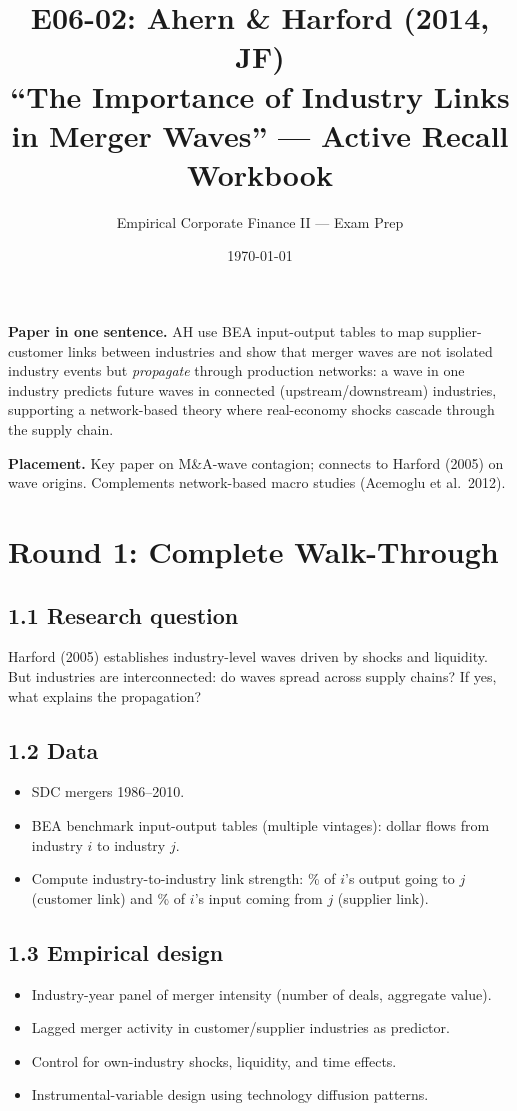 \documentclass[11pt]{article}
\title{E06-02: Ahern \& Harford (2014, JF) \\
\large ``The Importance of Industry Links in Merger Waves'' --- Active Recall Workbook}
\author{Empirical Corporate Finance II --- Exam Prep}
\date{\today}
\begin{document}
\maketitle

\begin{keybox}
\textbf{Paper in one sentence.} AH use BEA input-output tables to map supplier-customer links between industries and show that merger waves are not isolated industry events but \emph{propagate} through production networks: a wave in one industry predicts future waves in connected (upstream/downstream) industries, supporting a network-based theory where real-economy shocks cascade through the supply chain.

\textbf{Placement.} Key paper on M\&A-wave contagion; connects to Harford (2005) on wave origins. Complements network-based macro studies (Acemoglu et al.\ 2012).
\end{keybox}

\section*{Round 1: Complete Walk-Through}

\subsection*{1.1 Research question}
Harford (2005) establishes industry-level waves driven by shocks and liquidity. But industries are interconnected: do waves spread across supply chains? If yes, what explains the propagation?

\subsection*{1.2 Data}
\begin{itemize}
\item SDC mergers 1986--2010.
\item BEA benchmark input-output tables (multiple vintages): dollar flows from industry $i$ to industry $j$.
\item Compute industry-to-industry link strength: \% of $i$'s output going to $j$ (customer link) and \% of $i$'s input coming from $j$ (supplier link).
\end{itemize}

\subsection*{1.3 Empirical design}
\begin{itemize}
\item Industry-year panel of merger intensity (number of deals, aggregate value).
\item Lagged merger activity in customer/supplier industries as predictor.
\item Control for own-industry shocks, liquidity, and time effects.
\item Instrumental-variable design using technology diffusion patterns.
\end{itemize}
\end{document}

